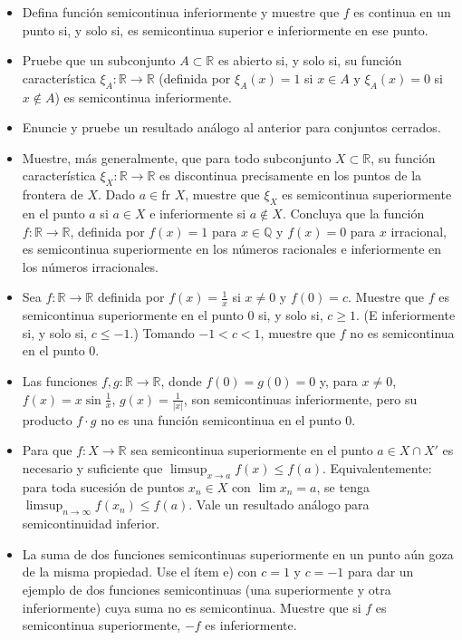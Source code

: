 \documentclass[12pt,oneside]{book}
\begin{document}
\begin{itemize}
    \item[a)] Defina función semicontinua inferiormente y muestre que \(f\) es continua en un punto si, y solo si, es semicontinua superior e inferiormente en ese punto.
    \item[b)] Pruebe que un subconjunto \(A \subset \mathbb{R}\) es abierto si, y solo si, su función característica \(\xi_A: \mathbb{R} \to \mathbb{R}\) (definida por \(\xi_A(x) = 1\) si \(x \in A\) y \(\xi_A(x) = 0\) si \(x \notin A\)) es semicontinua inferiormente.
    \item[c)] Enuncie y pruebe un resultado análogo al anterior para conjuntos cerrados.
    \item[d)] Muestre, más generalmente, que para todo subconjunto \(X \subset \mathbb{R}\), su función característica \(\xi_X: \mathbb{R} \to \mathbb{R}\) es discontinua precisamente en los puntos de la frontera de \(X\). Dado \(a \in \text{fr } X\), muestre que \(\xi_X\) es semicontinua superiormente en el punto \(a\) si \(a \in X\) e inferiormente si \(a \notin X\). Concluya que la función \(f: \mathbb{R} \to \mathbb{R}\), definida por \(f(x) = 1\) para \(x \in \mathbb{Q}\) y \(f(x) = 0\) para \(x\) irracional, es semicontinua superiormente en los números racionales e inferiormente en los números irracionales.
    \item[e)] Sea \(f: \mathbb{R} \to \mathbb{R}\) definida por \(f(x) = \frac{1}{x}\) si \(x \neq 0\) y \(f(0) = c\). Muestre que \(f\) es semicontinua superiormente en el punto \(0\) si, y solo si, \(c \geq 1\). (E inferiormente si, y solo si, \(c \leq -1\).) Tomando \(-1 < c < 1\), muestre que \(f\) no es semicontinua en el punto \(0\).
    \item[f)] Las funciones \(f, g: \mathbb{R} \to \mathbb{R}\), donde \(f(0) = g(0) = 0\) y, para \(x \neq 0\), \(f(x) = x \sin \frac{1}{x}\), \(g(x) = \frac{1}{|x|}\), son semicontinuas inferiormente, pero su producto \(f \cdot g\) no es una función semicontinua en el punto \(0\).
    \item[g)] Para que \(f: X \to \mathbb{R}\) sea semicontinua superiormente en el punto \(a \in X \cap X'\) es necesario y suficiente que \(\limsup_{x \to a} f(x) \leq f(a)\). Equivalentemente: para toda sucesión de puntos \(x_n \in X\) con \(\lim x_n = a\), se tenga \(\limsup_{n \to \infty} f(x_n) \leq f(a)\). Vale un resultado análogo para semicontinuidad inferior.
    \item[h)] La suma de dos funciones semicontinuas superiormente en un punto aún goza de la misma propiedad. Use el ítem e) con \(c = 1\) y \(c = -1\) para dar un ejemplo de dos funciones semicontinuas (una superiormente y otra inferiormente) cuya suma no es semicontinua. Muestre que si \(f\) es semicontinua superiormente, \(-f\) es inferiormente.

\end{itemize}
\end{document}
